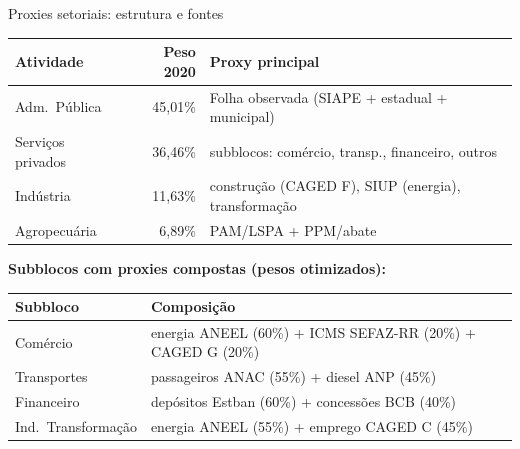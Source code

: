 \documentclass[aspectratio=169,11pt]{beamer}
\begin{document}
\begin{frame}{Proxies setoriais: estrutura e fontes}
\small
\begin{tabular}{p{4.0cm}rp{5.0cm}}
\toprule
\textbf{Atividade} & \textbf{Peso 2020} & \textbf{Proxy principal} \\
\midrule
Adm.\ Pública & 45,01\% & Folha observada (SIAPE + estadual + municipal) \\
Serviços privados & 36,46\% & subblocos: comércio, transp., financeiro, outros \\
Indústria & 11,63\% & construção (CAGED F), SIUP (energia), transformação \\
Agropecuária & 6,89\% & PAM/LSPA + PPM/abate \\
\bottomrule
\end{tabular}

\vspace{0.2cm}
\textbf{Subblocos com proxies compostas (pesos otimizados):}

\begin{tabular}{p{3.4cm}p{6.8cm}}
\toprule
\textbf{Subbloco} & \textbf{Composição} \\
\midrule
Comércio & energia ANEEL (60\%) + ICMS SEFAZ-RR (20\%) + CAGED G (20\%) \\
Transportes & passageiros ANAC (55\%) + diesel ANP (45\%) \\
Financeiro & depósitos Estban (60\%) + concessões BCB (40\%) \\
Ind.\ Transformação & energia ANEEL (55\%) + emprego CAGED C (45\%) \\
\bottomrule
\end{tabular}
\end{frame}
\end{document}
